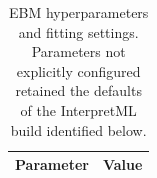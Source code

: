 \begin{table}[H]
\centering
\caption{EBM hyperparameters and fitting settings. Parameters not explicitly configured retained the defaults of the InterpretML build identified below.}
\label{tab:ebm_hyperparameters}
\begin{tabular}{@{}ll@{}}
\toprule
Parameter & Value \\
\midrule
\bottomrule
\end{tabular}
\end{table}
